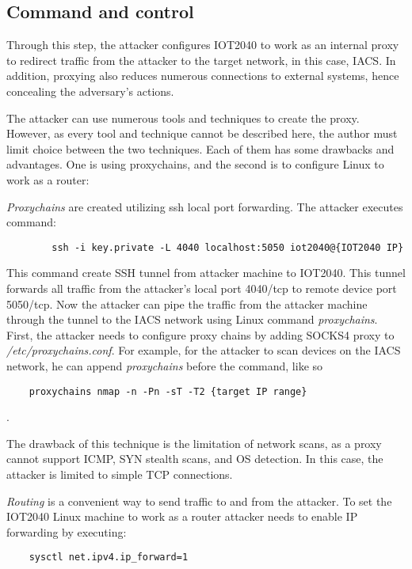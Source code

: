 \subsection{Command and control}

Through this step, the attacker configures IOT2040 to work as an internal proxy to redirect traffic from the attacker to the target network, in this case, IACS. In addition, proxying also reduces numerous connections to external systems, hence concealing the adversary's actions.

The attacker can use numerous tools and techniques to create the proxy. However, as every tool and technique cannot be described here, the author must limit choice between the two techniques. Each of them has some drawbacks and advantages. One is using proxychains, and the second is to configure Linux to work as a router:

\textit{Proxychains} are created utilizing ssh local port forwarding. The attacker executes command:
	
\begin{verbatim}
		ssh -i key.private -L 4040 localhost:5050 iot2040@{IOT2040 IP}
\end{verbatim} 

This command create SSH tunnel from attacker machine to IOT2040. This tunnel forwards all traffic from the attacker's local port 4040/tcp to remote device port 5050/tcp. Now the attacker can pipe the traffic from the attacker machine through the tunnel to the IACS network using Linux command \textit{proxychains}. First, the attacker needs to configure proxy chains by adding SOCKS4 proxy to  \textit{/etc/proxychains.conf}. For example, for the attacker to scan devices on the IACS network, he can append \textit{proxychains} before the command, like so


\begin{verbatim}
	proxychains nmap -n -Pn -sT -T2 {target IP range}
\end{verbatim}
 \textit{}. 
 
The drawback of this technique is the limitation of network scans, as a proxy cannot support ICMP, SYN stealth scans, and OS detection. In this case, the attacker is limited to simple TCP connections.
	
\textit{Routing} is a convenient way to send traffic to and from the attacker. To set the IOT2040 Linux machine to work as a router attacker needs to enable IP forwarding by executing: 

\begin{verbatim}
	sysctl net.ipv4.ip_forward=1
\end{verbatim}

